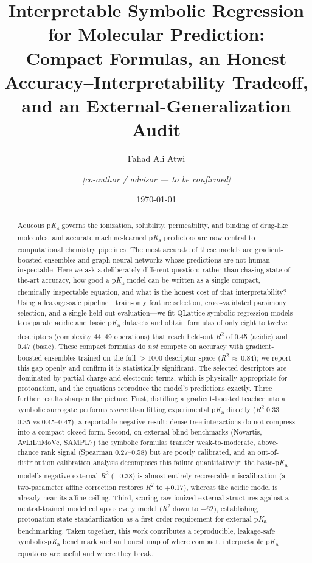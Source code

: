 \documentclass[11pt]{article}
\title{\bfseries Interpretable Symbolic Regression for Molecular \pka{} Prediction:\\
Compact Formulas, an Honest Accuracy--Interpretability Tradeoff,\\ and an External-Generalization Audit}
\author[1]{Fahad Ali Atwi}
\author[1]{\textit{[co-author / advisor --- to be confirmed]}}
\affil[1]{\textit{[Affiliation --- to be confirmed]}}
\date{\today}
\newcommand{\pka}{p\textit{K}\textsubscript{a}}
\newcommand{\rtwo}{\textit{R}\textsuperscript{2}}
\begin{document}
\maketitle

\begin{abstract}
\noindent
Aqueous \pka{} governs the ionization, solubility, permeability, and binding of
drug-like molecules, and accurate machine-learned \pka{} predictors are now
central to computational chemistry pipelines. The most accurate of these models
are gradient-boosted ensembles and graph neural networks whose predictions are
not human-inspectable. Here we ask a deliberately different question: rather than
chasing state-of-the-art accuracy, how good a \pka{} model can be written as a
single compact, chemically inspectable equation, and what is the honest cost of
that interpretability? Using a leakage-safe pipeline---train-only feature
selection, cross-validated parsimony selection, and a single held-out
evaluation---we fit QLattice symbolic-regression models to separate acidic and
basic \pka{} datasets and obtain formulas of only eight to twelve descriptors
(complexity 44--49 operations) that reach held-out \rtwo{} of 0.45 (acidic) and
0.47 (basic). These compact formulas do \emph{not} compete on accuracy with
gradient-boosted ensembles trained on the full $>$1000-descriptor space
(\rtwo{}\,$\approx$\,0.84); we report this gap openly and confirm it is
statistically significant. The selected descriptors are dominated by
partial-charge and electronic terms, which is physically appropriate for
protonation, and the equations reproduce the model's predictions exactly.
Three further results sharpen the picture. First, distilling a gradient-boosted
teacher into a symbolic surrogate performs \emph{worse} than fitting experimental
\pka{} directly (\rtwo{} 0.33--0.35 vs 0.45--0.47), a reportable negative result:
dense tree interactions do not compress into a compact closed form. Second, on
external blind benchmarks (Novartis, AvLiLuMoVe, SAMPL7) the symbolic formulas
transfer weak-to-moderate, above-chance rank signal (Spearman 0.27--0.58) but are
poorly calibrated, and an out-of-distribution calibration analysis decomposes this
failure quantitatively: the basic-\pka{} model's negative external \rtwo{}
($-0.38$) is almost entirely recoverable miscalibration (a two-parameter affine
correction restores \rtwo{} to $+0.17$), whereas the acidic model is already
near its affine ceiling. Third, scoring raw ionized external structures against a
neutral-trained model collapses every model (\rtwo{} down to $-62$), establishing
protonation-state standardization as a first-order requirement for external
\pka{} benchmarking. Taken together, this work contributes a reproducible,
leakage-safe symbolic-\pka{} benchmark and an honest map of where compact,
interpretable \pka{} equations are useful and where they break.
\end{abstract}
\end{document}
